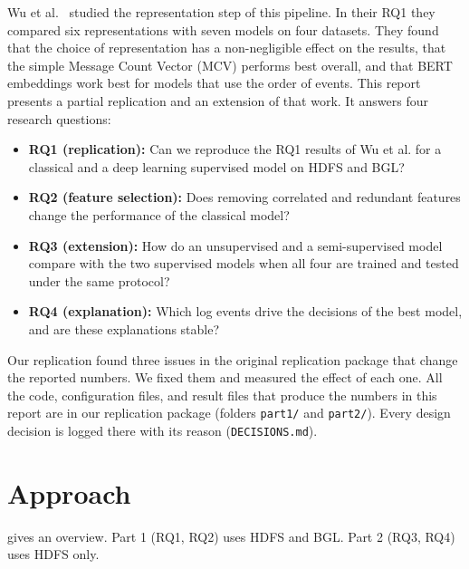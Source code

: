 \documentclass[10pt, conference]{IEEEtran}
\begin{document}
Wu et al.~\cite{wu2023effectiveness} studied the representation step of this pipeline. In their RQ1 they compared six representations with seven models on four datasets. They found that the choice of representation has a non-negligible effect on the results, that the simple Message Count Vector (MCV) performs best overall, and that BERT embeddings work best for models that use the order of events. This report presents a partial replication and an extension of that work. It answers four research questions:

\begin{itemize}
\item \textbf{RQ1 (replication):} Can we reproduce the RQ1 results of Wu et al. for a classical and a deep learning supervised model on HDFS and BGL?
\item \textbf{RQ2 (feature selection):} Does removing correlated and redundant features change the performance of the classical model?
\item \textbf{RQ3 (extension):} How do an unsupervised and a semi-supervised model compare with the two supervised models when all four are trained and tested under the same protocol?
\item \textbf{RQ4 (explanation):} Which log events drive the decisions of the best model, and are these explanations stable?
\end{itemize}

Our replication found three issues in the original replication package that change the reported numbers. We fixed them and measured the effect of each one. All the code, configuration files, and result files that produce the numbers in this report are in our replication package (folders \texttt{part1/} and \texttt{part2/}). Every design decision is logged there with its reason (\texttt{DECISIONS.md}).

\section{Approach}
\label{sec:approach}

 gives an overview. Part 1 (RQ1, RQ2) uses HDFS and BGL. Part 2 (RQ3, RQ4) uses HDFS only.
\end{document}
